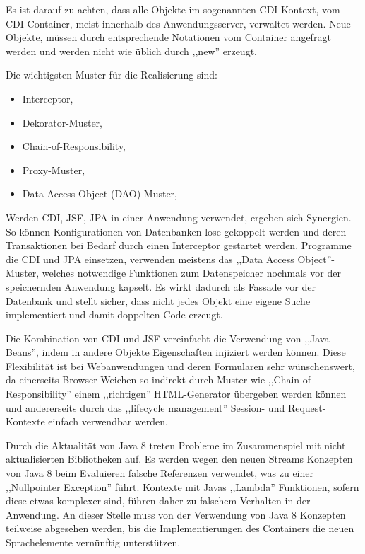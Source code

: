 \documentclass[oneside, ngerman, toc=bibliography,bibliography=totoc,listof=entryprefix, open=right,numbers=noenddot,fontsize=12pt]{scrbook}
\begin{document}
Es ist darauf zu achten, dass alle Objekte im sogenannten {CDI-Kontext}, vom CDI-Container, meist innerhalb des Anwendungsserver, verwaltet werden. Neue Objekte, müssen durch entsprechende Notationen vom Container angefragt werden und werden nicht wie üblich durch ,,new'' erzeugt.

\bigskip
Die wichtigsten Muster für die Realisierung sind:

\begin{itemize}
    \item Interceptor, \cite{schmidt2002pattern}
    \item Dekorator-Muster, \cite{gamma2011entwurfsmuster}
    \item Chain-of-Responsibility, \cite{gamma2011entwurfsmuster}
    \item Proxy-Muster, \cite{gamma2011entwurfsmuster}
    \item Data Access Object (DAO) Muster, \cite{bien2003j2ee}
\end{itemize}

Werden {CDI}, {JSF}, {JPA} in einer Anwendung verwendet, ergeben sich Synergien. So können Konfigurationen von Datenbanken lose gekoppelt werden und deren Transaktionen bei Bedarf durch einen Interceptor gestartet werden. Programme die {CDI} und {JPA} einsetzen, verwenden meistens das ,,Data Access Object''-Muster, welches notwendige Funktionen zum Datenspeicher nochmals vor der speichernden Anwendung kapselt. Es wirkt dadurch als Fassade vor der Datenbank und stellt sicher, dass nicht jedes Objekt eine eigene Suche implementiert und damit doppelten Code erzeugt.

Die Kombination von {CDI} und {JSF} vereinfacht die Verwendung von ,,Java Beans'', indem in andere Objekte Eigenschaften injiziert werden können. Diese Flexibilität ist bei Webanwendungen und deren Formularen sehr wünschenswert, da einerseits Browser-Weichen so indirekt durch Muster wie  ,,Chain-of-Responsibility'' einem ,,richtigen'' HTML-Generator übergeben werden können und andererseits durch das ,,lifecycle management'' Session- und Request-Kontexte einfach verwendbar werden. 

Durch die Aktualität von Java 8 treten Probleme im Zusammenspiel mit nicht aktualisierten Bibliotheken auf. Es werden wegen den neuen Streams Konzepten von Java 8 beim Evaluieren falsche Referenzen verwendet, was zu einer ,,Nullpointer Exception'' führt. Kontexte mit Javas ,,Lambda'' Funktionen, sofern diese etwas komplexer sind, führen daher zu falschem Verhalten in der Anwendung.
An dieser Stelle muss von der Verwendung von Java 8 Konzepten teilweise abgesehen werden, bis die Implementierungen des Containers die neuen Sprachelemente vernünftig unterstützen.
\end{document}
